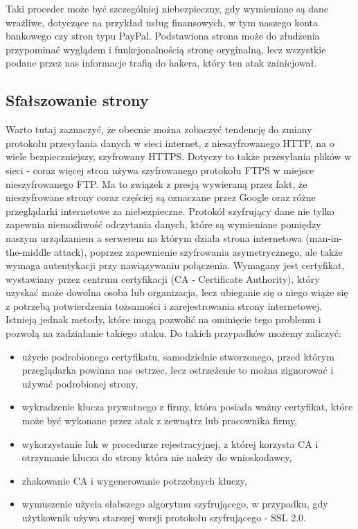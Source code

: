 Taki proceder może być szczególniej niebezpieczny, gdy wymieniane są dane wrażliwe, dotyczące na przykład usług finansowych, w tym naszego konta bankowego czy stron typu PayPal. Podstawiona strona może do złudzenia przypominać wyglądem i funkcjonalnością stronę oryginalną, lecz wszystkie podane przez nas informacje trafią do hakera, który ten atak zainicjował. 

\subsection{Sfałszowanie strony}

\hspace{0.5cm} Warto tutaj zaznaczyć, że obecnie można zobaczyć tendencję do zmiany protokołu przesyłania danych w sieci internet, z nieszyfrowanego HTTP, na o wiele bezpieczniejszy, szyfrowany HTTPS. Dotyczy to także przesyłania plików w sieci - coraz więcej stron używa szyfrowanego protokołu FTPS w miejsce nieszyfrowanego FTP. Ma to związek z presją wywieraną przez fakt, że nieszyfrowane strony coraz częściej są oznaczane przez Google oraz różne przeglądarki internetowe za niebezpieczne. Protokół szyfrujący dane nie tylko zapewnia niemożliwość odczytania danych, które są wymieniane pomiędzy naszym urządzaniem a serwerem na którym działa strona internetowa (man-in-the-middle attack), poprzez zapewnienie szyfrowania asymetrycznego, ale także wymaga autentykacji przy nawiązywaniu połączenia. Wymagany jest certyfikat, wystawiany przez centrum certyfikacji (CA - Certificate Authority), który uzyskać może dowolna osoba lub organizacja, lecz ubieganie się o niego wiąże się z potrzebą potwierdzenia tożsamości i zarejestrowania strony internetowej. Istnieją jednak metody, które mogą pozwolić na ominięcie tego problemu i pozwolą na zadziałanie takiego ataku. Do takich przypadków możemy zaliczyć:

\begin{itemize}
\item  użycie podrobionego certyfikatu, samodzielnie stworzonego, przed którym przeglądarka powinna nas ostrzec, lecz ostrzeżenie to można zignorować i używać podrobionej strony,
\item wykradzenie klucza prywatnego z firmy, która posiada ważny certyfikat, które może być wykonane przez atak z zewnątrz lub pracownika firmy, 
\item wykorzystanie luk w procedurze rejestracyjnej, z której korzysta CA i otrzymanie klucza do strony która nie należy do wnioskodawcy,
\item zhakowanie CA i wygenerowanie potrzebnych kluczy,
\item wymuszenie użycia słabszego algorytmu szyfrującego, w przypadku, gdy użytkownik używa starszej wersji protokołu szyfrującego - SSL 2.0.
\end{itemize}


